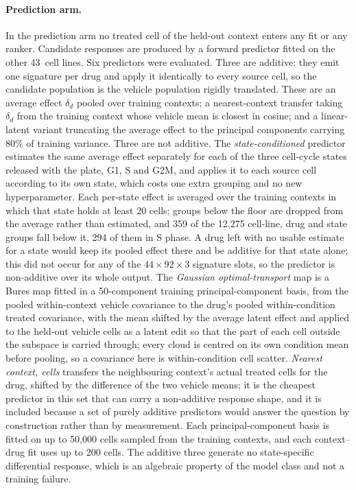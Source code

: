 \documentclass[11pt,letterpaper]{article}
\newcommand{\NFITCTX}{43}               %
\begin{document}
\paragraph{Prediction arm.}
In the prediction arm no treated cell of the held-out context enters any fit or any ranker.
Candidate responses are produced by a forward predictor fitted on the other \NFITCTX\ cell lines.
Six predictors were evaluated. Three are additive: they emit one signature per drug and apply it
identically to every source cell, so the candidate population is the vehicle population rigidly
translated. These are an average effect $\delta_d$ pooled over training contexts; a nearest-context
transfer taking $\delta_d$ from the training context whose vehicle mean is closest in cosine; and a
linear-latent variant truncating the average effect to the principal components carrying 80\% of
training variance. Three are not additive. The \emph{state-conditioned} predictor estimates the
same average effect separately for each of the three cell-cycle states released with the plate, G1,
S and G2M, and applies it to each source cell according to its own state, which costs one extra
grouping and no new hyperparameter. Each per-state effect is averaged over the training contexts in which that state holds at least
20 cells; groups below the floor are dropped from the average rather than estimated, and 359 of
the 12,275 cell-line, drug and state groups fall below it, 294 of them in S phase. A drug left
with no usable estimate for a state would keep its pooled effect there and be additive for that
state alone; this did not occur for any of the $44\times92\times3$ signature slots, so the
predictor is non-additive over its whole output. The \emph{Gaussian optimal-transport} map
is a Bures map fitted in a 50-component training principal-component basis, from the
pooled within-context vehicle covariance to the drug's pooled within-condition treated covariance,
with the mean shifted by the average latent effect and applied to the held-out vehicle cells as a
latent edit so that the part of each cell outside the subspace is carried through; every cloud is
centred on its own condition mean before pooling, so a covariance here is within-condition cell
scatter. \emph{Nearest context, cells} transfers the neighbouring context's actual treated cells
for the drug, shifted by the difference of the two vehicle means; it is the cheapest predictor in
this set that can carry a non-additive response shape, and it is included because a set of purely
additive predictors would answer the question by construction rather than by measurement. Each
principal-component basis is fitted on up to 50,000 cells sampled from the training contexts, and
each context--drug fit uses up to 200 cells. The additive three generate no state-specific
differential response, which is an algebraic property of the model class and not a training
failure.
\end{document}

